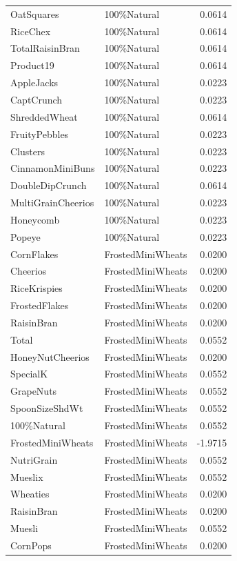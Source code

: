 \begin{longtable}{llr}
OatSquares & 100\%Natural & 0.0614 \\
RiceChex & 100\%Natural & 0.0614 \\
TotalRaisinBran & 100\%Natural & 0.0614 \\
Product19 & 100\%Natural & 0.0614 \\
AppleJacks & 100\%Natural & 0.0223 \\
CaptCrunch & 100\%Natural & 0.0223 \\
ShreddedWheat & 100\%Natural & 0.0614 \\
FruityPebbles & 100\%Natural & 0.0223 \\
Clusters & 100\%Natural & 0.0223 \\
CinnamonMiniBuns & 100\%Natural & 0.0223 \\
DoubleDipCrunch & 100\%Natural & 0.0614 \\
MultiGrainCheerios & 100\%Natural & 0.0223 \\
Honeycomb & 100\%Natural & 0.0223 \\
Popeye & 100\%Natural & 0.0223 \\
CornFlakes & FrostedMiniWheats & 0.0200 \\
Cheerios & FrostedMiniWheats & 0.0200 \\
RiceKrispies & FrostedMiniWheats & 0.0200 \\
FrostedFlakes & FrostedMiniWheats & 0.0200 \\
RaisinBran & FrostedMiniWheats & 0.0200 \\
Total & FrostedMiniWheats & 0.0552 \\
HoneyNutCheerios & FrostedMiniWheats & 0.0200 \\
SpecialK & FrostedMiniWheats & 0.0552 \\
GrapeNuts & FrostedMiniWheats & 0.0552 \\
SpoonSizeShdWt & FrostedMiniWheats & 0.0552 \\
100\%Natural & FrostedMiniWheats & 0.0552 \\
FrostedMiniWheats & FrostedMiniWheats & -1.9715 \\
NutriGrain & FrostedMiniWheats & 0.0552 \\
Mueslix & FrostedMiniWheats & 0.0552 \\
Wheaties & FrostedMiniWheats & 0.0200 \\
RaisinBran & FrostedMiniWheats & 0.0200 \\
Muesli & FrostedMiniWheats & 0.0552 \\
CornPops & FrostedMiniWheats & 0.0200 \\

\end{longtable}
